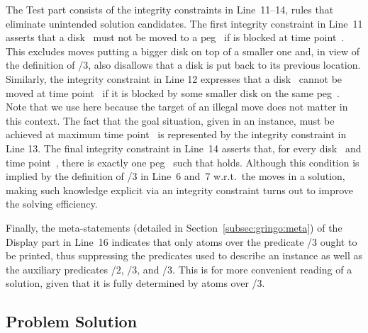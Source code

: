 The Test part consists of the integrity constraints in Line~11--14,
rules that eliminate unintended solution candidates.
The first integrity constraint in Line~11 asserts 
that a disk~ must not be moved to a peg~
if  is blocked at time point~.
This excludes moves putting a bigger disk on top of a smaller one and,
in view of the definition of /$3$,
also disallows that a disk is put back to its previous location.
Similarly, the integrity constraint in Line 12 
expresses that a disk~ cannot be moved at time point~
if it is blocked by some smaller disk on the same peg~.
Note that we use  here because the
target of an illegal move does not matter in this context.
The fact that the goal situation, given in an instance,
must be achieved at maximum time point~
is represented by the integrity constraint in Line 13.
The final integrity constraint in Line~14
asserts that, for every disk~ and time point~, 
there is exactly one peg~ such that
 holds.
Although this condition is implied by the definition of /$3$ in Line~6 and~7
w.r.t.\ the moves in a solution,
making such knowledge explicit via an integrity constraint
turns out to improve the solving efficiency.

Finally, the meta-statements (detailed in Section~\ref{subsec:gringo:meta})
of the Display part in Line~16
indicates that only atoms over the predicate /$3$ ought to be printed,
thus suppressing the predicates used to describe an instance as well as
the auxiliary predicates /$2$, /$3$, and /$3$.
This is for more convenient reading of a solution,
given that it is fully determined by atoms over /$3$.

\subsection{Problem Solution}


